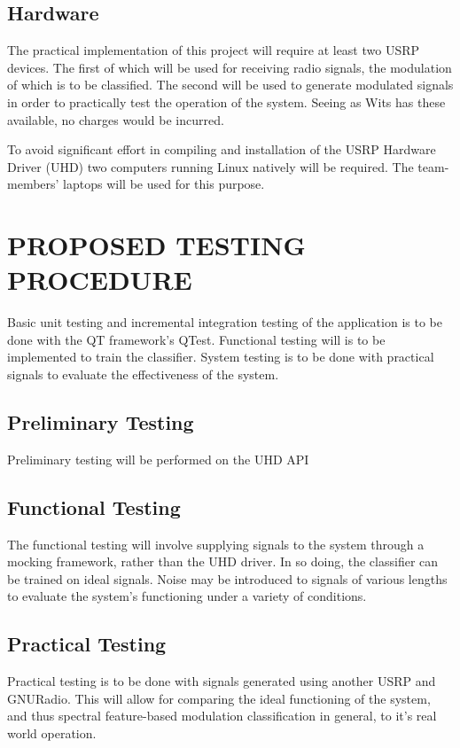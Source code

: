 \documentclass[10pt,onecolumn]{witseiepaper}
\begin{document}
\begin{multicols}{2}
	\subsection{Hardware}
		The practical implementation of this project will require at least two USRP devices. The first of which will be used for receiving radio signals, the modulation of which is to be classified. The second will be used to generate modulated signals in order to practically test the operation of the system. Seeing as Wits has these available, no charges would be incurred.

		To avoid significant effort in compiling and installation of the USRP Hardware Driver (UHD) two computers running Linux natively will be required. The team-members' laptops will be used for this purpose.

\section{PROPOSED TESTING PROCEDURE}
	Basic unit testing and incremental integration testing of the application is to be done with the QT framework's QTest. Functional testing will is to be implemented to train the classifier. System testing is to be done with practical signals to evaluate the effectiveness of the system.

	\subsection{Preliminary Testing}
	Preliminary testing will be performed on the UHD API


	\subsection{Functional Testing}
		The functional testing will involve supplying signals to the system through a mocking framework, rather than the UHD driver. In so doing, the classifier can be trained on ideal signals. Noise may be introduced to signals of various lengths to evaluate the system's functioning under a variety of conditions.

	\subsection{Practical Testing}
		Practical testing is to be done with signals generated using another USRP and GNURadio. This will allow for comparing the ideal functioning of the system, and thus spectral feature-based modulation classification in general, to it's real world operation.

\end{multicols}
\end{document}
